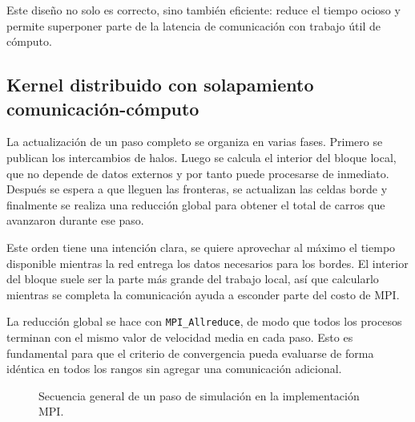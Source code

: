 Este diseño no solo es correcto, sino también eficiente: reduce el tiempo ocioso y permite superponer parte de la latencia de comunicación con trabajo útil de cómputo.

\subsection{Kernel distribuido con solapamiento comunicación-cómputo}

La actualización de un paso completo se organiza en varias fases. Primero se publican los intercambios de halos. Luego se calcula el interior del bloque local, que no depende de datos externos y por tanto puede procesarse de inmediato. Después se espera a que lleguen las fronteras, se actualizan las celdas borde y finalmente se realiza una reducción global para obtener el total de carros que avanzaron durante ese paso.

Este orden tiene una intención clara, se quiere aprovechar al máximo el tiempo disponible mientras la red entrega los datos necesarios para los bordes. El interior del bloque suele ser la parte más grande del trabajo local, así que calcularlo mientras se completa la comunicación ayuda a esconder parte del costo de MPI.

La reducción global se hace con \texttt{MPI\_Allreduce}, de modo que todos los procesos terminan con el mismo valor de velocidad media en cada paso. Esto es fundamental para que el criterio de convergencia pueda evaluarse de forma idéntica en todos los rangos sin agregar una comunicación adicional.

\begin{figure}[H]
\centering
{}
\caption{Secuencia general de un paso de simulación en la implementación MPI.}
\label{fig:flujo_mpi}
\end{figure}

